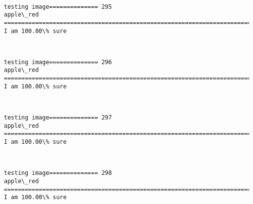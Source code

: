 \documentclass[11pt]{article}
\begin{document}
    \begin{center}
    \end{center}
    { \hspace*{\fill} \\}
    
    \begin{Verbatim}[commandchars=\\\{\}]
testing image============== 295
apple\_red
============================================================================
I am 100.00\% sure

    \end{Verbatim}

    \begin{center}
    \end{center}
    { \hspace*{\fill} \\}
    
    \begin{Verbatim}[commandchars=\\\{\}]
testing image============== 296
apple\_red
============================================================================
I am 100.00\% sure

    \end{Verbatim}

    \begin{center}
    \end{center}
    { \hspace*{\fill} \\}
    
    \begin{Verbatim}[commandchars=\\\{\}]
testing image============== 297
apple\_red
============================================================================
I am 100.00\% sure

    \end{Verbatim}

    \begin{center}
    \end{center}
    { \hspace*{\fill} \\}
    
    \begin{Verbatim}[commandchars=\\\{\}]
testing image============== 298
apple\_red
============================================================================
I am 100.00\% sure

    \end{Verbatim}
\end{document}
